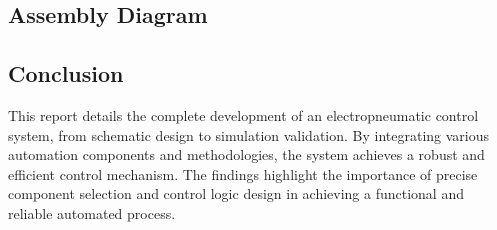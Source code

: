 \subsection{Assembly Diagram} \label{sec:Assembly_Diagram}

\subsection{Conclusion}

This report details the complete development of an electropneumatic control system, from schematic 
design to simulation validation. By integrating various automation components and methodologies, 
the system achieves a robust and efficient control mechanism. The findings highlight the importance 
of precise component selection and control logic design in achieving a functional and reliable 
automated process.